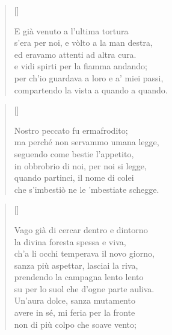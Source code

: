 \documentclass{article}
\begin{document}
\begin{verse}[\versewidth]
  \begin{patverse*}
    E già venuto a l'ultima tortura\\
    s'era per noi, e vòlto a la man destra,\\
    ed eravamo attenti ad altra cura.\\
    e vidi spirti per la fiamma andando;\\
    per ch'io guardava a loro e a' miei passi,\\
    compartendo la vista a quando a quando.
  \end{patverse*}
\end{verse}

\begin{verse}[\versewidth]
  \begin{patverse*}
    Nostro peccato fu ermafrodito;\\
    ma perché non servammo umana legge,\\
    seguendo come bestie l'appetito,\\
    in obbrobrio di noi, per noi si legge,\\
    quando partinci, il nome di colei\\
    che s'imbestiò ne le 'mbestiate schegge.
  \end{patverse*}
\end{verse}

\begin{verse}[\versewidth]
  \begin{patverse*}
    Vago già di cercar dentro e dintorno\\
    la divina foresta spessa e viva,\\
    ch'a li occhi temperava il novo giorno,\\
    sanza più aspettar, lasciai la riva,\\
    prendendo la campagna lento lento\\
    su per lo suol che d'ogne parte auliva.\\
    Un'aura dolce, sanza mutamento\\
    avere in sé, mi feria per la fronte\\
    non di più colpo che soave vento;
  \end{patverse*}
\end{verse}
\end{document}
